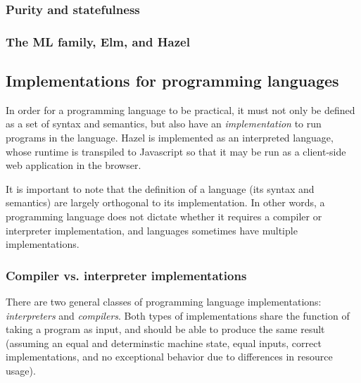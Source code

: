 




\subsubsection{Purity and statefulness}
\label{sec:purity}

\subsubsection{The ML family, Elm, and Hazel}
\label{sec:ml-fam}


\subsection{Implementations for programming languages}
\label{sec:interpreters}

In order for a programming language to be practical, it must not only be defined as a set of syntax and semantics, but also have an \textit{implementation} to run programs in the language. Hazel is implemented as an interpreted language, whose runtime is transpiled to Javascript so that it may be run as a client-side web application in the browser.

It is important to note that the definition of a language (its syntax and semantics) are largely orthogonal to its implementation. In other words, a programming language does not dictate whether it requires a compiler or interpreter implementation, and languages sometimes have multiple implementations.

\subsubsection{Compiler vs. interpreter implementations}
\label{sec:comp-vs-interp}


There are two general classes of programming language implementations: \textit{interpreters} and \textit{compilers}. Both types of implementations share the function of taking a program as input, and should be able to produce the same result (assuming an equal and determinstic machine state, equal inputs, correct implementations, and no exceptional behavior due to differences in resource usage).

